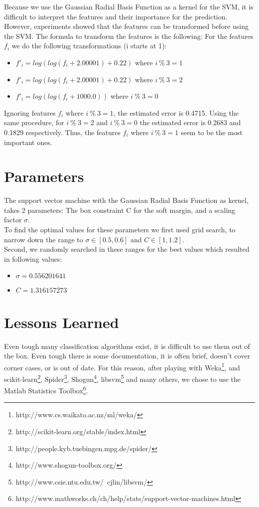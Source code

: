 \documentclass[a4paper, 11pt]{article}
\begin{document}
Because we use the Gaussian Radial Basis Function as a kernel for the SVM, it is difficult to interpret the features and their importance for the prediction. However, experiments showed that the features can be transformed before using the SVM. The formula to transform the features is the following:
For the features $f_{i}$ we do the following transformations (i starts at 1):
\begin{itemize}
\item $f'_{i}=log(log(f_{i} + 2.00001) + 0.22)$ where $i\ \%\ 3=1$
\item $f'_{i}=log(log(f_{i} + 2.00001) + 0.22)$ where $i\ \%\ 3=2$
\item $f'_{i}=log(log(f_{i} + 1000.0))$ where $i\ \%\ 3=0$
\end{itemize}

Ignoring features $f_{i}$ where $i\ \%\ 3=1$, the estimated error is 0.4715. Using the same procedure, for $i\ \%\ 3=2$ and $i\ \%\ 3=0$ the estimated error is 0.2683 and 0.1829 respectively. Thus, the features $f_{i}$ where $i\ \%\ 3=1$ seem to be the most important ones.

\section{Parameters}
\label{sec:Parameters}
The support vector machine with the Gaussian Radial Basis Function as kernel, takes 2 parameters: The box constraint C for the soft margin, and a scaling factor $\sigma$.\\
To find the optimal values for these parameters we first used grid search, to narrow down the range to $\sigma \in [0.5, 0.6]$ and $C \in [1, 1.2]$.\\
Second, we randomly searched in these ranges for the best values which resulted in following values:

\begin{itemize}
\item $\sigma=0.556201641$
\item $C=1.316157273$
\end{itemize}

\section{Lessons Learned}

Even tough many classification algorithms exist, it is difficult to use them out of the box. Even tough there is some documentation, it is often brief, doesn't cover corner cases, or is out of date. For this reason, after playing with Weka\footnote{http://www.cs.waikato.ac.nz/ml/weka/}, and scikit-learn\footnote{http://scikit-learn.org/stable/index.html}, Spider\footnote{http://people.kyb.tuebingen.mpg.de/spider/}, Shogun\footnote{http://www.shogun-toolbox.org/}, libsvm\footnote{http://www.csie.ntu.edu.tw/~cjlin/libsvm/} and many others, we chose to use the Matlab Statistics Toolbox\footnote{http://www.mathworks.ch/ch/help/stats/support-vector-machines.html}.
\end{document}
